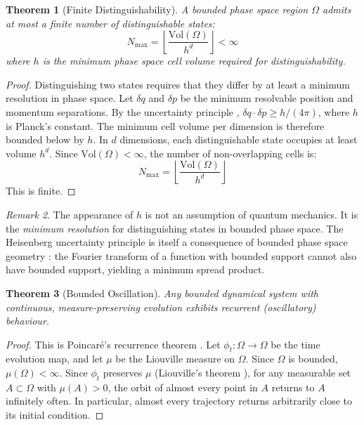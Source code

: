 \documentclass[twocolumn,10pt,a4paper]{article}
\theoremstyle{plain}
\newtheorem{theorem}{Theorem}[section]
\theoremstyle{definition}
\theoremstyle{remark}
\newtheorem{remark}[theorem]{Remark}
\begin{document}
\begin{theorem}[Finite Distinguishability]
\label{thm:finite_states}
A bounded phase space region $\Omega$ admits at most a finite number of distinguishable states:
\begin{equation}
    N_{\max} = \left\lfloor \frac{\mathrm{Vol}(\Omega)}{h^d} \right\rfloor < \infty
\end{equation}
where $h$ is the minimum phase space cell volume required for distinguishability.
\end{theorem}

\begin{proof}
Distinguishing two states requires that they differ by at least a minimum resolution in phase space. Let $\delta q$ and $\delta p$ be the minimum resolvable position and momentum separations. By the uncertainty principle \cite{heisenberg1927}, $\delta q \cdot \delta p \geq h/(4\pi)$, where $h$ is Planck's constant. The minimum cell volume per dimension is therefore bounded below by $h$. In $d$ dimensions, each distinguishable state occupies at least volume $h^d$. Since $\mathrm{Vol}(\Omega) < \infty$, the number of non-overlapping cells is:
\begin{equation}
    N_{\max} = \left\lfloor \frac{\mathrm{Vol}(\Omega)}{h^d} \right\rfloor
\end{equation}
This is finite.
\end{proof}

\begin{remark}
The appearance of $h$ is not an assumption of quantum mechanics. It is the \emph{minimum resolution} for distinguishing states in bounded phase space. The Heisenberg uncertainty principle is itself a consequence of bounded phase space geometry \cite{weyl1927}: the Fourier transform of a function with bounded support cannot also have bounded support, yielding a minimum spread product.
\end{remark}

\begin{theorem}[Bounded Oscillation]
\label{thm:oscillation}
Any bounded dynamical system with continuous, measure-preserving evolution exhibits recurrent (oscillatory) behaviour.
\end{theorem}

\begin{proof}
This is Poincar\'{e}'s recurrence theorem \cite{poincare1890}. Let $\phi_t : \Omega \to \Omega$ be the time evolution map, and let $\mu$ be the Liouville measure on $\Omega$. Since $\Omega$ is bounded, $\mu(\Omega) < \infty$. Since $\phi_t$ preserves $\mu$ (Liouville's theorem \cite{liouville1838}), for any measurable set $A \subset \Omega$ with $\mu(A) > 0$, the orbit of almost every point in $A$ returns to $A$ infinitely often. In particular, almost every trajectory returns arbitrarily close to its initial condition.
\end{proof}
\end{document}
